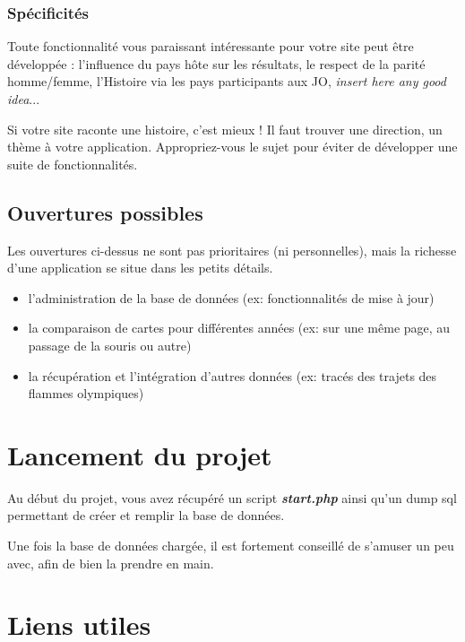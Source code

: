 \documentclass{article}
\begin{document}
\subsubsection{Spécificités}

Toute fonctionnalité vous paraissant intéressante pour votre site peut être développée : l'influence du pays hôte sur les résultats, le respect de la parité homme/femme, l'Histoire via les pays participants aux JO, \textit{insert here any good idea}...

Si votre site raconte une histoire, c'est mieux ! Il faut trouver une direction, un thème à votre application. Appropriez-vous le sujet pour éviter de développer une suite de fonctionnalités.

\subsection{Ouvertures possibles}

Les ouvertures ci-dessus ne sont pas prioritaires (ni personnelles), mais la richesse d'une application se situe dans les petits détails.

\begin{itemize}

\item l'administration de la base de données (ex: fonctionnalités de mise à jour)

\item la comparaison de cartes pour différentes années (ex: sur une même page, au passage de la souris ou autre)

\item la récupération et l'intégration d'autres données (ex: tracés des trajets des flammes olympiques)

\end{itemize}

\section{Lancement du projet}

Au début du projet, vous avez récupéré un script \textbf{\textit{start.php}} ainsi qu'un dump sql permettant de créer et remplir la base de données.

Une fois la base de données chargée, il est fortement conseillé de s'amuser un peu avec, afin de bien la prendre en main.

\section{Liens utiles}
\end{document}
